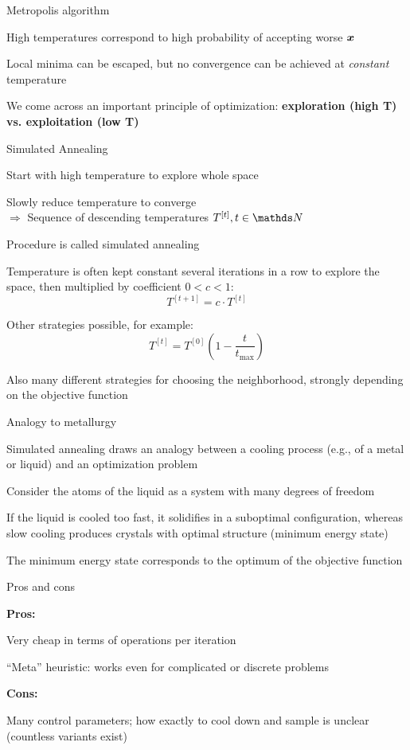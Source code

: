 \documentclass[11pt,compress,t,notes=noshow, xcolor=table]{beamer}
\begin{document}
\begin{framei}{Metropolis algorithm}
\item High temperatures correspond to high probability of accepting worse $\bm{x}$
\item Local minima can be escaped, but no convergence can be achieved at \textit{constant} temperature
\item We come across an important principle of optimization: \textbf{exploration (high T) vs. exploitation (low T)}
\spacer
{}
\end{framei}


\begin{framei}{Simulated Annealing}
\item Start with high temperature to explore whole space
\item Slowly reduce temperature to converge \\
$\Rightarrow$ Sequence of descending temperatures $T^{[t]}, t \in \N$
\item Procedure is called simulated annealing
\item Temperature is often kept constant several iterations in a row to explore the space, then multiplied by coefficient $0<c<1$:
$$T^{[t+1]} = c \cdot T^{[t]}$$
\item Other strategies possible, for example:
$$T^{[t]} = T^{[0]} \left( 1 - \frac{t}{t_{\text{max}}} \right)$$
\item Also many different strategies for choosing the neighborhood, strongly depending on the objective function
\end{framei}


\begin{framei}[fs=normalsize,sep=L]{Analogy to metallurgy}
\item Simulated annealing draws an analogy between a cooling process (e.g., of a metal or liquid) and an optimization problem
\item Consider the atoms of the liquid as a system with many degrees of freedom
\item If the liquid is cooled too fast, it solidifies in a suboptimal configuration, whereas slow cooling produces crystals with optimal structure (minimum energy state)
\item The minimum energy state corresponds to the optimum of the objective function
\end{framei}

\begin{framei}[sep=L]{Pros and cons}
\item[] \textbf{Pros:}
\item Very cheap in terms of operations per iteration
\item \enquote{Meta} heuristic: works even for complicated or discrete problems
\vfill
\item[] \textbf{Cons:}
\item Many control parameters; how exactly to cool down and sample is unclear (countless variants exist)
\end{framei}

\endlecture
\end{document}
